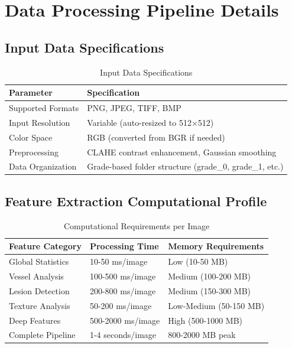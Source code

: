 \documentclass[11pt]{article}
\begin{document}
\section{Data Processing Pipeline Details}

\subsection{Input Data Specifications}
\begin{table}[h!]
\centering
\begin{tabular}{p{}p{}}
\toprule
\textbf{Parameter} & \textbf{Specification} \\
\midrule
Supported Formats & PNG, JPEG, TIFF, BMP \\
Input Resolution & Variable (auto-resized to 512×512) \\
Color Space & RGB (converted from BGR if needed) \\
Preprocessing & CLAHE contrast enhancement, Gaussian smoothing \\
Data Organization & Grade-based folder structure (grade\_0, grade\_1, etc.) \\
\bottomrule
\end{tabular}
\caption{Input Data Specifications}
\end{table}

\subsection{Feature Extraction Computational Profile}
\begin{table}[h!]
\centering
\begin{tabular}{p{}p{}p{}}
\toprule
\textbf{Feature Category} & \textbf{Processing Time} & \textbf{Memory Requirements} \\
\midrule
Global Statistics & 10-50 ms/image & Low (10-50 MB) \\
Vessel Analysis & 100-500 ms/image & Medium (100-200 MB) \\
Lesion Detection & 200-800 ms/image & Medium (150-300 MB) \\
Texture Analysis & 50-200 ms/image & Low-Medium (50-150 MB) \\
Deep Features & 500-2000 ms/image & High (500-1000 MB) \\
Complete Pipeline & 1-4 seconds/image & 800-2000 MB peak \\
\bottomrule
\end{tabular}
\caption{Computational Requirements per Image}
\end{table}
\end{document}
